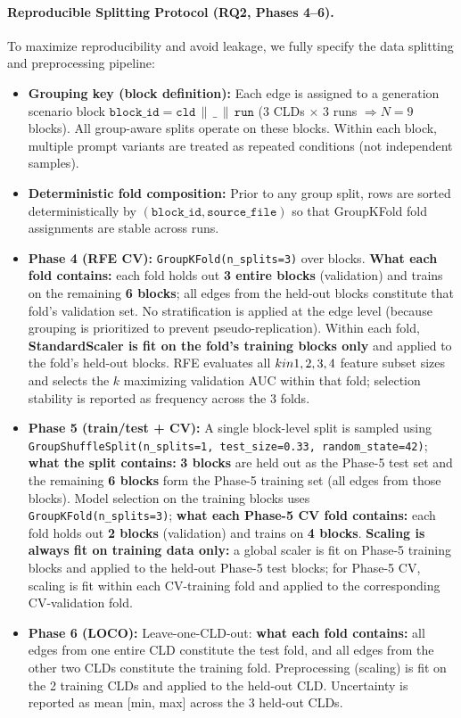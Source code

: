\paragraph{Reproducible Splitting Protocol (RQ2, Phases 4--6).}
To maximize reproducibility and avoid leakage, we fully specify the data splitting and preprocessing pipeline:
\begin{itemize}[noitemsep]
    \item \textbf{Grouping key (block definition):} Each edge is assigned to a generation scenario block $\texttt{block\_id} = \texttt{cld} \,\|\, \texttt{\_} \,\|\, \texttt{run}$ (3 CLDs $\times$ 3 runs $\Rightarrow N=9$ blocks). All group-aware splits operate on these blocks. Within each block, multiple prompt variants are treated as repeated conditions (not independent samples).
    \item \textbf{Deterministic fold composition:} Prior to any group split, rows are sorted deterministically by $(\texttt{block\_id}, \texttt{source\_file})$ so that GroupKFold fold assignments are stable across runs.
    \item \textbf{Phase 4 (RFE CV):} \texttt{GroupKFold(n\_splits=3)} over blocks. \textbf{What each fold contains:} each fold holds out \textbf{3 entire blocks} (validation) and trains on the remaining \textbf{6 blocks}; all edges from the held-out blocks constitute that fold's validation set. No stratification is applied at the edge level (because grouping is prioritized to prevent pseudo-replication). Within each fold, \textbf{StandardScaler is fit on the fold's training blocks only} and applied to the fold's held-out blocks. RFE evaluates all $k\\in\\{1,2,3,4\\}$ feature subset sizes and selects the $k$ maximizing validation AUC within that fold; selection stability is reported as frequency across the 3 folds.
    \item \textbf{Phase 5 (train/test + CV):} A single block-level split is sampled using \texttt{GroupShuffleSplit(n\_splits=1, test\_size=0.33, random\_state=42)}; \textbf{what the split contains:} \textbf{3 blocks} are held out as the Phase-5 test set and the remaining \textbf{6 blocks} form the Phase-5 training set (all edges from those blocks). Model selection on the training blocks uses \texttt{GroupKFold(n\_splits=3)}; \textbf{what each Phase-5 CV fold contains:} each fold holds out \textbf{2 blocks} (validation) and trains on \textbf{4 blocks}. \textbf{Scaling is always fit on training data only:} a global scaler is fit on Phase-5 training blocks and applied to the held-out Phase-5 test blocks; for Phase-5 CV, scaling is fit within each CV-training fold and applied to the corresponding CV-validation fold.
    \item \textbf{Phase 6 (LOCO):} Leave-one-CLD-out: \textbf{what each fold contains:} all edges from one entire CLD constitute the test fold, and all edges from the other two CLDs constitute the training fold. Preprocessing (scaling) is fit on the 2 training CLDs and applied to the held-out CLD. Uncertainty is reported as mean [min, max] across the 3 held-out CLDs.
\end{itemize}

